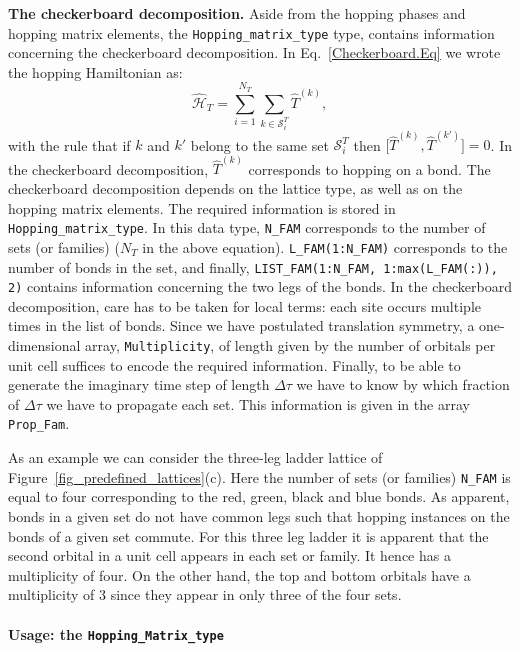 \noindent
\textbf{The checkerboard decomposition.}   Aside from the hopping phases and hopping matrix elements, the \texttt{Hopping\_matrix\_type} type, contains information  concerning the checkerboard   decomposition.  In Eq.~\ref{Checkerboard.Eq} we wrote the hopping Hamiltonian as:
\begin{equation}
\hat{\mathcal{H}}_{T}     = \sum_{i=1}^{N_T} \sum_{k \in \mathcal{S}^{T}_i} \hat{T}^{(k)},  
\end{equation}
with the rule that  if $k$ and $k'$  belong to the same set $\mathcal{S}^{T}_i $ then   $ \big[ \hat{T}^{(k)} , \hat{T}^{(k')} \big] = 0 $.  In the checkerboard decomposition, $\hat{T}^{(k)}$   corresponds to  hopping on a bond.    The checkerboard decomposition depends on the   lattice type, as well as on the hopping matrix elements.   The required  information is stored in  \texttt{Hopping\_matrix\_type}. In this data type,  \texttt{N\_FAM}  corresponds to the number of sets  (or families) ($N_T$ in the above equation). \texttt{L\_FAM(1:N\_FAM)}   corresponds to the number of bonds in the set,  and finally,  \texttt{LIST\_FAM(1:N\_FAM, 1:max(L\_FAM(:)), 2)}    contains  information concerning the two legs of the bonds.    In the checkerboard decomposition, care has to be taken for local terms: each site  occurs multiple times in the list of bonds.    Since we have postulated translation symmetry,    a one-dimensional array, \texttt{Multiplicity},  of length  given by  the number of orbitals per unit cell suffices to  encode the required information.  
Finally, to be able to generate  the imaginary time step of length $\Delta \tau$  we  have to know   by which fraction of  $\Delta \tau$   we have to propagate each set.  This information is given in  the array  \texttt{Prop\_Fam}.  

As an  example we can consider the three-leg ladder lattice of Figure~\ref{fig_predefined_lattices}(c).   Here the number of sets (or families) \texttt{N\_FAM}  is equal to four  corresponding to the red, green, black and blue  bonds.  As apparent,  bonds in a given set do not have common legs such that hopping instances on the bonds of a given set commute.     For this three leg ladder  it is apparent that the  second orbital in a unit cell appears  in each set or family. It hence has a multiplicity of four. On the other hand, the top and bottom orbitals have a multiplicity of 3 since they appear in only three of the four sets. 



\paragraph*{Usage: the \texttt{Hopping\_Matrix\_type} } %


